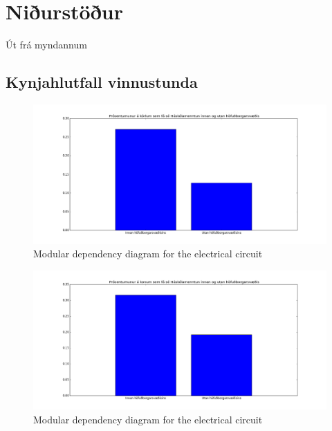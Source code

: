 \documentclass[12pt, svn, draft]{rureport}
\begin{document}



\section{Niðurstöður}\label{nidurstodur}
Út frá myndannum 

\subsection{Kynjahlutfall vinnustunda}

\begin{figure}
	\centering 
	\includegraphics[width=\textwidth]{../graphics/Haskolamentun_karlar_innan_utan_hs.png}
	\caption{Modular dependency diagram for the electrical circuit \label{fig:menntukarla}}
\end{figure}

\begin{figure}
	\centering 
	\includegraphics[width=\textwidth]{../graphics/Haskolamentun_konur_innan_utan_hs.png}
	\caption{Modular dependency diagram for the electrical circuit \label{fig:menntunkonur}}
\end{figure}
\end{document}
